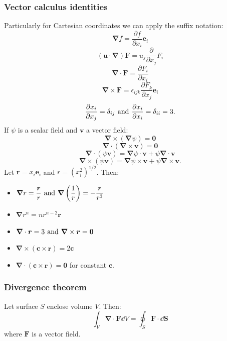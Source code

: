 \documentclass{article}
\newcommand{\vc}[1]{\boldsymbol{#1}}
\begin{document}
\begin{multicols*}{3}
\subsubsection*{Vector calculus identities}
Particularly for Cartesian coordinates
we can apply the suffix notation:
$$\vc{\nabla}f=
\frac{\partial f}{\partial x_i}\vc{e}_i$$
$$(\vc{u}\cdot\vc{\nabla})\vc{F}
=u_j\frac{\partial}{\partial x_j}F_i$$
$$\vc{\nabla}\cdot\vc{F}=
\frac{\partial F_i}{\partial x_i}$$
$$\vc{\nabla}\times\vc{F}
=\epsilon_{ijk}\frac{\partial F_k}{\partial x_j}
\vc{e}_i$$
$$\frac{\partial x_i}{\partial x_j}=\delta_{ij}
\hspace{0.05in}\text{and}\hspace{0.05in}
\frac{\partial x_i}{\partial x_i}=\delta_{ii}=3.$$
If $\psi$ is a scalar field and $\vc{v}$ a vector field:
$$\vc{\nabla}\times(\vc{\nabla}\psi)=\vc{0}$$
$$\vc{\nabla}\cdot(\vc{\nabla}\times\vc{v})=\vc{0}$$
$$\vc{\nabla}\cdot(\psi\vc{v})
=\vc{\nabla}\psi\cdot\vc{v}+\psi\vc{\nabla}\cdot\vc{v}$$
$$\vc{\nabla}\times(\psi\vc{v})
=\vc{\nabla}\psi\times\vc{v}+\psi\vc{\nabla}\times\vc{v}.$$
Let $\vc{r}=x_i\vc{e}_i$ and $r=(x_i^2)^{1/2}$. Then:
\begin{itemize}
    \item $\displaystyle\vc{\nabla}r=\frac{\vc{r}}{r}
    \hspace{0.05in}\text{and}\hspace{0.05in}
    \vc{\nabla}\left(\frac{1}{r}\right)
    =-\frac{\vc{r}}{r^3}$
    
    \item $\displaystyle\vc{\nabla}r^n
    =n r^{n-2}\vc{r}$
    
    \item $\displaystyle\vc{\nabla}\cdot\vc{r}=3
    \hspace{0.05in}\text{and}\hspace{0.05in}
    \vc{\nabla}\times\vc{r}=\vc{0}$

    \item $\displaystyle\vc{\nabla}\times
    (\vc{c}\times\vc{r})=2\vc{c}$
    
    \item $\displaystyle\vc{\nabla}
    \cdot(\vc{c}\times\vc{r})=\vc{0}$
    for constant $\vc{c}$.
\end{itemize}

\subsubsection*{Divergence theorem}
Let surface $S$ enclose volume $V$. Then:
$$\int_V \vc{\nabla}\cdot\vc{F}\dd V
=\oint_S \vc{F}\cdot\dd\vc{S}$$
where $\vc{F}$ is a vector field.


\end{multicols*}
\end{document}
